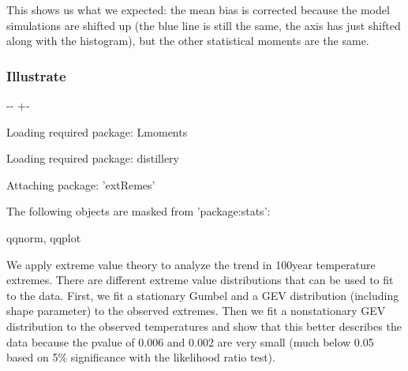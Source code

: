 \documentclass[letterpaper,10pt,english]{sphinxmanual}
\newlength\nbsphinxcodecellspacing
\begin{document}
This shows us what we expected: the mean bias is corrected because the model simulations are shifted up (the blue line is still the same, the axis has just shifted along with the histogram), but the other statistical moments are the same.


\subsubsection{Illustrate}
\label{\detokenize{Notebooks/examples/California_Fires:Illustrate}}
{
\begin{sphinxVerbatim}[commandchars=\\\{\}]
\llap{\color{nbsphinxin}[8]:\,\hspace{\fboxrule}\hspace{\fboxsep}}
\end{sphinxVerbatim}
}

{

\kern-\sphinxverbatimsmallskipamount\kern-\baselineskip
\kern+\FrameHeightAdjust\kern-\fboxrule
\vspace{\nbsphinxcodecellspacing}

\begin{sphinxVerbatim}[commandchars=\\\{\}]
Loading required package: Lmoments

Loading required package: distillery


Attaching package: 'extRemes'


The following objects are masked from 'package:stats':

    qqnorm, qqplot


\end{sphinxVerbatim}
}

We apply extreme value theory to analyze the trend in 100\sphinxhyphen{}year temperature extremes. There are different extreme value distributions that can be used to fit to the data. First, we fit a stationary Gumbel and a GEV distribution (including shape parameter) to the observed extremes. Then we fit a nonstationary GEV distribution to the observed temperatures and show that this better describes the data because the p\sphinxhyphen{}value of 0.006 and 0.002 are very small (much below 0.05 based on 5\% significance with
the likelihood ratio test).
\end{document}
